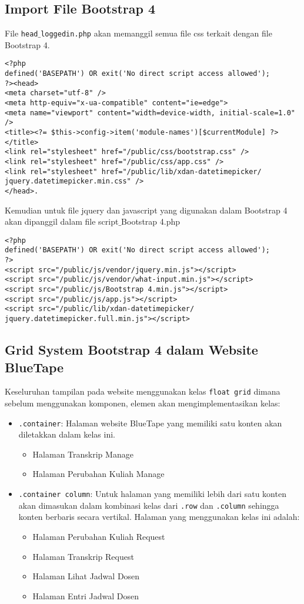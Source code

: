 \subsection{Import File Bootstrap 4}
File \texttt{head$\_$loggedin.php} akan memanggil semua file css terkait dengan file Bootstrap 4.
\begin{lstlisting}[frame=single, basicstyle=\small]
<?php
defined('BASEPATH') OR exit('No direct script access allowed');
?><head>
<meta charset="utf-8" />
<meta http-equiv="x-ua-compatible" content="ie=edge">
<meta name="viewport" content="width=device-width, initial-scale=1.0" />
<title><?= $this->config->item('module-names')[$currentModule] ?></title>
<link rel="stylesheet" href="/public/css/bootstrap.css" />
<link rel="stylesheet" href="/public/css/app.css" />
<link rel="stylesheet" href="/public/lib/xdan-datetimepicker/
jquery.datetimepicker.min.css" />
</head>.
\end{lstlisting}
Kemudian untuk file jquery dan javascript yang digunakan dalam Bootstrap 4 akan dipanggil dalam file script$\_$Bootstrap 4.php
\begin{lstlisting}[frame=single, basicstyle=\small]
<?php
defined('BASEPATH') OR exit('No direct script access allowed');
?>
<script src="/public/js/vendor/jquery.min.js"></script>
<script src="/public/js/vendor/what-input.min.js"></script>
<script src="/public/js/Bootstrap 4.min.js"></script>
<script src="/public/js/app.js"></script>
<script src="/public/lib/xdan-datetimepicker/
jquery.datetimepicker.full.min.js"></script>
\end{lstlisting}

\subsection{Grid System Bootstrap 4 dalam Website BlueTape}
Keseluruhan tampilan pada website menggunakan kelas \texttt{float grid} dimana sebelum menggunakan komponen, elemen akan mengimplementasikan kelas:
\begin{itemize}
	\item \texttt{.container}: Halaman website BlueTape yang memiliki satu konten akan diletakkan dalam kelas ini.
	\begin{itemize}
		\item Halaman Transkrip Manage
		\item Halaman Perubahan Kuliah Manage
	\end{itemize}
	\item \texttt{.container column}: Untuk halaman yang memiliki lebih dari satu konten akan dimasukan dalam kombinasi kelas dari \texttt{.row} dan \texttt{.column} sehingga konten berbaris secara vertikal.  Halaman yang menggunakan kelas ini adalah:
	\begin{itemize}
		\item Halaman Perubahan Kuliah Request
		\item Halaman Transkrip Request
		\item Halaman Lihat Jadwal Dosen
		\item Halaman Entri Jadwal Dosen
	\end{itemize}	
	
\end{itemize}

